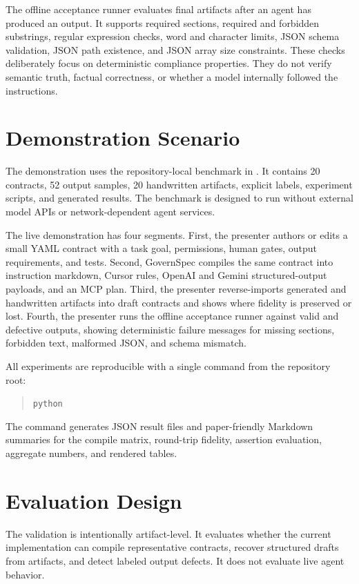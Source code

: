 \documentclass[11pt]{article}
\begin{document}
The offline acceptance runner evaluates final artifacts after an agent has produced
an output. It supports required sections, required and forbidden substrings, regular
expression checks, word and character limits, JSON schema validation, JSON path
existence, and JSON array size constraints. These checks deliberately focus on
deterministic compliance properties. They do not verify semantic truth, factual
correctness, or whether a model internally followed the instructions.

\section{Demonstration Scenario}

The demonstration uses the repository-local benchmark in
. It contains 20 contracts, 52 output
samples, 20 handwritten artifacts, explicit labels, experiment scripts, and
generated results.
The benchmark is designed to run without external model APIs or network-dependent
agent services.

The live demonstration has four segments. First, the presenter authors or edits a
small YAML contract with a task goal, permissions, human gates, output
requirements, and tests. Second, GovernSpec compiles the same contract into
instruction markdown, Cursor rules, OpenAI and Gemini structured-output payloads,
and an MCP plan. Third, the presenter reverse-imports generated and handwritten
artifacts into draft contracts and shows where fidelity is preserved or lost.
Fourth, the presenter runs the offline acceptance runner against valid and defective
outputs, showing deterministic failure messages for missing sections, forbidden
text, malformed JSON, and schema mismatch.

All experiments are reproducible with a single command from the repository root:
\begin{quote}
\small\texttt{python} 
\end{quote}
The command generates JSON result files and paper-friendly Markdown summaries for
the compile matrix, round-trip fidelity, assertion evaluation, aggregate numbers,
and rendered tables.

\section{Evaluation Design}

The validation is intentionally artifact-level. It evaluates whether the current
implementation can compile representative contracts, recover structured drafts from
artifacts, and detect labeled output defects. It does not evaluate live agent
behavior.
\end{document}

